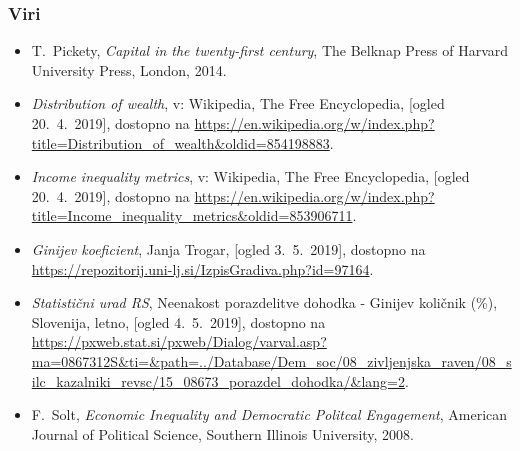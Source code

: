 \documentclass[10pt]{beamer}
\begin{document}
\begin{frame}
\frametitle{Viri}
	\begin{itemize}
		\item
			\label{Pickety}
			T.~Pickety, \emph{Capital in the twenty-first century}, The Belknap Press of 						Harvard University Press, London, 2014.

		\item 
			\label{Razdelitev premoženja}
			\emph{Distribution of wealth}, v: Wikipedia, The Free Encyclopedia, [ogled 							20.~4.~2019], dostopno na \url{https://en.wikipedia.org/w/index.php?								title=Distribution_of_wealth&oldid=854198883}.

		\item 
			\label{Metrike ekonomske neenakosti}
			\emph{Income inequality metrics}, v: Wikipedia, The Free Encyclopedia, [ogled 					20.~4.~2019], dostopno na \url{https://en.wikipedia.org/w/index.php?								title=Income_inequality_metrics&oldid=853906711}.

\item
\emph{Ginijev koeficient}, Janja Trogar, [ogled 3.~5.~2019], dostopno na \url{https://repozitorij.uni-lj.si/IzpisGradiva.php?id=97164}.

\item
\emph{Statistični urad RS}, Neenakost porazdelitve dohodka - Ginijev količnik (\%), Slovenija, letno, [ogled 4.~5.~2019], dostopno na \url{https://pxweb.stat.si/pxweb/Dialog/varval.asp?ma=0867312S&ti=&path=../Database/Dem_soc/08_zivljenjska_raven/08_silc_kazalniki_revsc/15_08673_porazdel_dohodka/&lang=2}.
\item
			F.~Solt, \emph{Economic Inequality and Democratic Politcal Engagement}, American Journal of Political Science, Southern Illinois University, 2008.
\end{itemize}
\end {frame}
\end{document}
